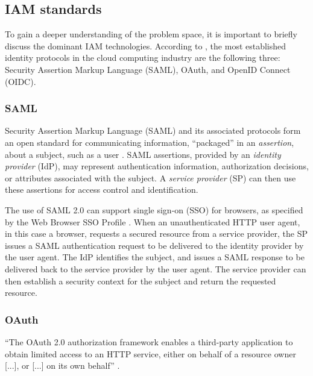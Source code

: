 \subsection{IAM standards}
To gain a deeper understanding of the problem space, it is important to briefly discuss the dominant IAM technologies. According to \textcite{Naik2016}, the most established identity protocols in the cloud computing industry are the following three: Security Assertion Markup Language (SAML), OAuth, and OpenID Connect (OIDC). 

\subsubsection{SAML}
Security Assertion Markup Language (SAML) and its associated protocols form an open standard for communicating information, ``packaged'' in an \emph{assertion}, about a subject, such as a user \autocite{Kemp2005}. SAML assertions, provided by an \emph{identity provider} (IdP), may represent authentication information, authorization decisions, or attributes associated with the subject. A \emph{service provider} (SP) can then use these assertions for access control and identification.

The use of SAML 2.0 can support single sign-on (SSO) for browsers, as specified by the Web Browser SSO Profile \autocite{Hughes2005}. When an unauthenticated HTTP user agent, in this case a browser, requests a secured resource from a service provider, the SP issues a SAML authentication request to be delivered to the identity provider by the user agent. The IdP identifies the subject, and issues a SAML response to be delivered back to the service provider by the user agent. The service provider can then establish a security context for the subject and return the requested resource. 

\subsubsection{OAuth}
``The OAuth 2.0 authorization framework enables a third-party
application to obtain limited access to an HTTP service, either on
behalf of a resource owner [...], or [...] on its own behalf'' \autocite{Hardt2023}.

